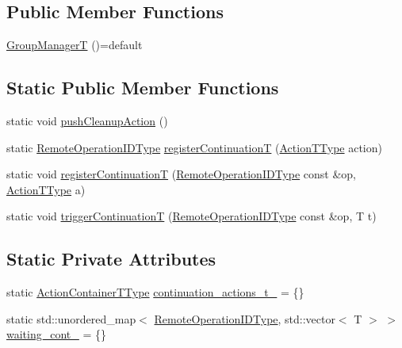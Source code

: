 \subsection*{Public Member Functions}
\begin{DoxyCompactItemize}
\item 
\hyperlink{structvt_1_1group_1_1_group_manager_t_a751380e18149d43fefffd79d22d96ebc}{Group\+ManagerT} ()=default
\end{DoxyCompactItemize}
\subsection*{Static Public Member Functions}
\begin{DoxyCompactItemize}
\item 
static void \hyperlink{structvt_1_1group_1_1_group_manager_t_ad149f3bfcb76761f22283a1bf6b147d0}{push\+Cleanup\+Action} ()
\item 
static \hyperlink{namespacevt_1_1group_a73f2624ddeb535b39a08b6524f26b244}{Remote\+Operation\+I\+D\+Type} \hyperlink{structvt_1_1group_1_1_group_manager_t_aa52eafbcdd4d1e8da4f17ef4cd03098a}{register\+ContinuationT} (\hyperlink{structvt_1_1group_1_1_group_manager_t_acb20922687d3165d97de391fdbaf02ca}{Action\+T\+Type} action)
\item 
static void \hyperlink{structvt_1_1group_1_1_group_manager_t_a0c366044c727d883691f89550c9706cd}{register\+ContinuationT} (\hyperlink{namespacevt_1_1group_a73f2624ddeb535b39a08b6524f26b244}{Remote\+Operation\+I\+D\+Type} const \&op, \hyperlink{structvt_1_1group_1_1_group_manager_t_acb20922687d3165d97de391fdbaf02ca}{Action\+T\+Type} a)
\item 
static void \hyperlink{structvt_1_1group_1_1_group_manager_t_a654b43bfc4360ba5c7f4a1680378bdad}{trigger\+ContinuationT} (\hyperlink{namespacevt_1_1group_a73f2624ddeb535b39a08b6524f26b244}{Remote\+Operation\+I\+D\+Type} const \&op, T t)
\end{DoxyCompactItemize}
\subsection*{Static Private Attributes}
\begin{DoxyCompactItemize}
\item 
static \hyperlink{structvt_1_1group_1_1_group_manager_t_adc0d6d680c4f8bdbb80cd90f84a5f7ee}{Action\+Container\+T\+Type} \hyperlink{structvt_1_1group_1_1_group_manager_t_ace6828eddb4d595c12ea5c07047207d6}{continuation\+\_\+actions\+\_\+t\+\_\+} = \{\}
\item 
static std\+::unordered\+\_\+map$<$ \hyperlink{namespacevt_1_1group_a73f2624ddeb535b39a08b6524f26b244}{Remote\+Operation\+I\+D\+Type}, std\+::vector$<$ T $>$ $>$ \hyperlink{structvt_1_1group_1_1_group_manager_t_a294adcb4f4b41892733f29b9dea70f9e}{waiting\+\_\+cont\+\_\+} = \{\}
\end{DoxyCompactItemize}
